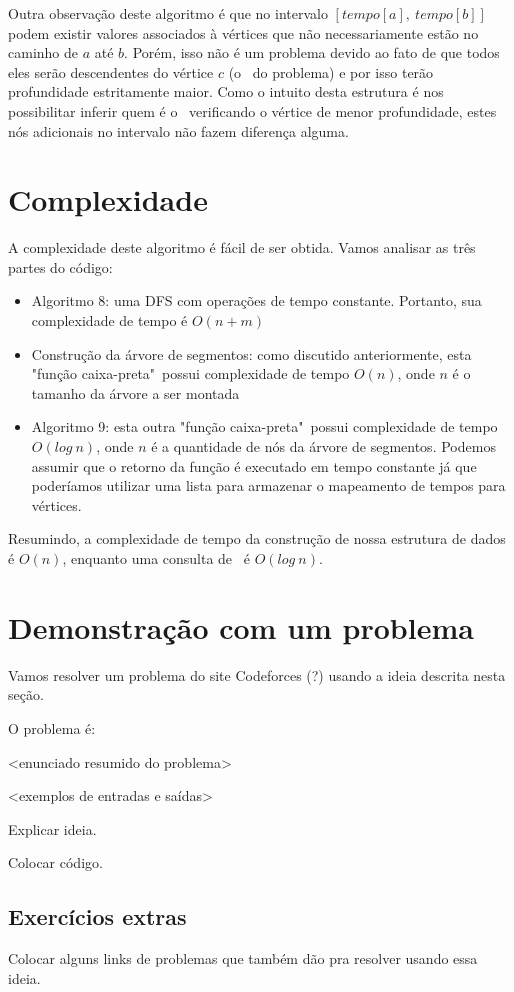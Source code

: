 Outra observação deste algoritmo é que no intervalo $[tempo[a],\ tempo[b]]$ podem existir valores associados à vértices que não necessariamente estão no caminho de $a$ até $b$. Porém, isso não é um problema devido ao fato de que todos eles serão descendentes do vértice $c$ (o \LCA\ do problema) e por isso terão profundidade estritamente maior. Como o intuito desta estrutura é nos possibilitar inferir quem é o \LCA\ verificando o vértice de menor profundidade, estes nós adicionais no intervalo não fazem diferença alguma.

\section{Complexidade}

A complexidade deste algoritmo é fácil de ser obtida. Vamos analisar as três partes do código:

\begin{itemize}
    \item Algoritmo 8: uma DFS com operações de tempo constante. Portanto, sua complexidade de tempo é $O(n+m)$
    \item Construção da árvore de segmentos: como discutido anteriormente, esta "função caixa-preta"\  possui complexidade de tempo $O(n)$, onde $n$ é o tamanho da árvore a ser montada
    \item Algoritmo 9: esta outra "função caixa-preta"\ possui complexidade de tempo $O(log\ n)$, onde $n$ é a quantidade de nós da árvore de segmentos. Podemos assumir que o retorno da função é executado em tempo constante já que poderíamos utilizar uma lista para armazenar o mapeamento de tempos para vértices.
\end{itemize}

Resumindo, a complexidade de tempo da construção de nossa estrutura de dados é $O(n)$, enquanto uma consulta de \LCA\ é $O(log\ n)$.

\section{Demonstração com um problema}

Vamos resolver um problema do site Codeforces (?) usando a ideia descrita nesta seção.

O problema é:

<enunciado resumido do problema>

<exemplos de entradas e saídas>

Explicar ideia.

Colocar código.


\subsection{Exercícios extras}

Colocar alguns links de problemas que também dão pra resolver usando essa ideia.